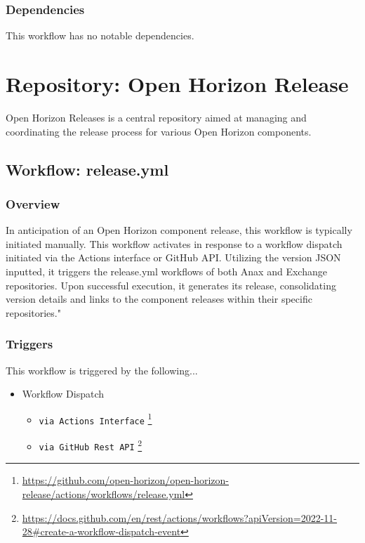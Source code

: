 \documentclass[a4paper,11pt]{article}
\begin{document}
\subsubsection{Dependencies}
This workflow has no notable dependencies.

\newpage
\section{Repository: Open Horizon Release}
Open Horizon Releases is a central repository aimed at managing and coordinating the release process for various Open Horizon components.

\subsection{Workflow: release.yml}

\subsubsection{Overview}
In anticipation of an Open Horizon component release, this workflow is typically initiated manually. This workflow activates in response to a workflow dispatch initiated via the Actions interface or GitHub API. Utilizing the version JSON inputted, it triggers the release.yml workflows of both Anax and Exchange repositories. Upon successful execution, it generates its release, consolidating version details and links to the component releases within their specific repositories."

\subsubsection{Triggers}
This workflow is triggered by the following...
\begin{itemize}
    \item Workflow Dispatch
    \begin{itemize}
        \item\verb|via Actions Interface| \footnote{\href{https://github.com/open-horizon/open-horizon-release/actions/workflows/release.yml}{https://github.com/open-horizon/open-horizon-release/actions/workflows/release.yml}}
        \item\verb|via GitHub Rest API| \footnote{\href{https://docs.github.com/en/rest/actions/workflows?apiVersion=2022-11-28\#create-a-workflow-dispatch-event}{https://docs.github.com/en/rest/actions/workflows?apiVersion=2022-11-28\#create-a-workflow-dispatch-event}}
    \end{itemize}
\end{itemize}
\end{document}
